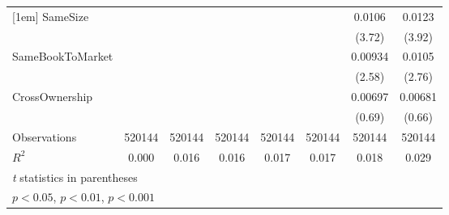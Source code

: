 {\begin{tabular}{l*{7}{c}}
[1em]
SameSize        &                  &                  &                  &                  &                  &   0.0106\sym{***}&   0.0123\sym{***}\\
                &                  &                  &                  &                  &                  &   (3.72)         &   (3.92)         \\
[1em]
SameBookToMarket&                  &                  &                  &                  &                  &  0.00934\sym{*}  &   0.0105\sym{**} \\
                &                  &                  &                  &                  &                  &   (2.58)         &   (2.76)         \\
[1em]
CrossOwnership  &                  &                  &                  &                  &                  &  0.00697         &  0.00681         \\
                &                  &                  &                  &                  &                  &   (0.69)         &   (0.66)         \\
\hline
Observations    &   520144         &   520144         &   520144         &   520144         &   520144         &   520144         &   520144         \\
\(R^{2}\)       &    0.000         &    0.016         &    0.016         &    0.017         &    0.017         &    0.018         &    0.029         \\
\hline\hline
\multicolumn{8}{l}{\footnotesize \textit{t} statistics in parentheses}\\
\multicolumn{8}{l}{\footnotesize \sym{*} \(p<0.05\), \sym{**} \(p<0.01\), \sym{***} \(p<0.001\)}\\
\end{tabular}
}
